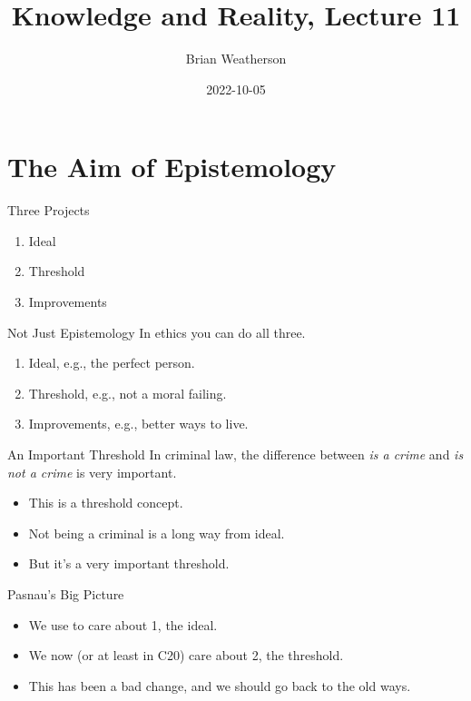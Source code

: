 \documentclass[
  17pt,
  letterpaper,
  ignorenonframetext,
  aspectratio=169,
  handout]{beamer}
\title{Knowledge and Reality, Lecture 11}
\author{Brian Weatherson}
\date{2022-10-05}
\providecommand{\tightlist}{%
  \setlength{\itemsep}{0pt}\setlength{\parskip}{0pt}}\usepackage{longtable,booktabs,array}
\begin{document}
\frame{\titlepage}
\ifdefined\Shaded\renewenvironment{Shaded}{\begin{tcolorbox}[boxrule=0pt, sharp corners, interior hidden, borderline west={3pt}{0pt}{shadecolor}, frame hidden, enhanced, breakable]}{\end{tcolorbox}}\fi

\hypertarget{the-aim-of-epistemology}{%
\section{The Aim of Epistemology}\label{the-aim-of-epistemology}}

\begin{frame}{Three Projects}
\protect\hypertarget{three-projects}{}
\begin{enumerate}[<+->]
\tightlist
\item
  Ideal
\item
  Threshold
\item
  Improvements
\end{enumerate}
\end{frame}

\begin{frame}{Not Just Epistemology}
\protect\hypertarget{not-just-epistemology}{}
In ethics you can do all three.

\begin{enumerate}[<+->]
\tightlist
\item
  Ideal, e.g., the perfect person.
\item
  Threshold, e.g., not a moral failing.
\item
  Improvements, e.g., better ways to live.
\end{enumerate}
\end{frame}

\begin{frame}{An Important Threshold}
\protect\hypertarget{an-important-threshold}{}
In criminal law, the difference between \emph{is a crime} and \emph{is
not a crime} is very important.

\begin{itemize}[<+->]
\tightlist
\item
  This is a threshold concept.
\item
  Not being a criminal is a long way from ideal.
\item
  But it's a very important threshold.
\end{itemize}
\end{frame}

\begin{frame}{Pasnau's Big Picture}
\protect\hypertarget{pasnaus-big-picture}{}
\begin{itemize}[<+->]
\tightlist
\item
  We use to care about 1, the ideal.
\item
  We now (or at least in C20) care about 2, the threshold.
\item
  This has been a bad change, and we should go back to the old ways.
\end{itemize}
\end{frame}
\end{document}
